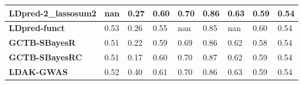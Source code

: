 \documentclass[pdflatex,sn-nature]{sn-jnl}%
\begin{document}
\begin{table}[!ht]
{\begin{tabular}{|l|l|l|l|l|l|l|l|l|}
\textbf{LDpred-2\_lassosum2}  \cite{Priv__2020} & nan                          & \cellcolor[HTML]{D8E082}0.27 & \cellcolor[HTML]{E2E383}0.60 & \cellcolor[HTML]{FEE182}0.70                                                     & \cellcolor[HTML]{FEEA83}0.86                                         & \cellcolor[HTML]{FEDE81}0.63                                                 & \cellcolor[HTML]{FEEA83}0.59                                                    & \cellcolor[HTML]{FDEB84}0.54 \\ \hline
\textbf{LDpred-funct}    \cite{M_rquez_Luna_2021}    & \cellcolor[HTML]{FEEA83}0.53 & \cellcolor[HTML]{E3E383}0.26 & \cellcolor[HTML]{FA8E72}0.55 & nan                                                                              & \cellcolor[HTML]{FEE683}0.85                                         & nan                                                                          & \cellcolor[HTML]{F6E984}0.60                                                    & \cellcolor[HTML]{F5E884}0.54 \\ \hline
\textbf{GCTB-SBayesR}   \cite{Zheng_2024}     & \cellcolor[HTML]{FBAC78}0.51 & \cellcolor[HTML]{FEE382}0.22 & \cellcolor[HTML]{EEE683}0.59 & \cellcolor[HTML]{FCB97A}0.69                                                     & \cellcolor[HTML]{FFEB84}0.86                                         & \cellcolor[HTML]{FBAE78}0.62                                                 & \cellcolor[HTML]{F87A6E}0.58                                                    & \cellcolor[HTML]{FEE482}0.54 \\ \hline
\textbf{GCTB-SBayesRC}   \cite{Lloyd_Jones_2019}    & \cellcolor[HTML]{F98A71}0.51 & \cellcolor[HTML]{FDC77D}0.17 & \cellcolor[HTML]{E3E383}0.60 & \cellcolor[HTML]{FED980}0.70                                                     & \cellcolor[HTML]{EEE784}0.87                                         & \cellcolor[HTML]{FCB579}0.62                                                 & \cellcolor[HTML]{FBA777}0.59                                                    & \cellcolor[HTML]{FEEA83}0.54 \\ \hline
\textbf{LDAK-GWAS}   \cite{Zhang_2021}        & \cellcolor[HTML]{FDD680}0.52 & \cellcolor[HTML]{63BE7B}0.40 & \cellcolor[HTML]{B5D680}0.61 & \cellcolor[HTML]{FDEB84}0.70                                                     & \cellcolor[HTML]{FEEB84}0.86                                         & \cellcolor[HTML]{FED880}0.63                                                 & \cellcolor[HTML]{FBA877}0.59                                                    & \cellcolor[HTML]{FFEB84}0.54 \\ \hline

\end{tabular}}
\end{table}
\end{document}
